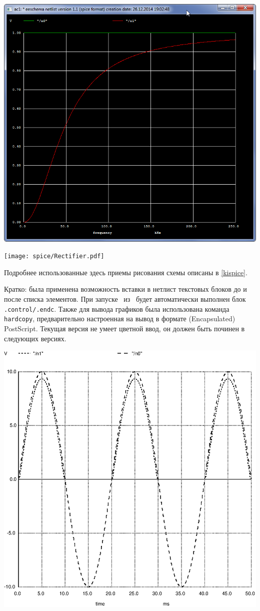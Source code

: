 \pagebreak\noindent
\includegraphics[height=\textheight]{spice/spice5.png}


\noindent
\texttt{[image: spice/Rectifier.pdf]}


Подробнее использованные здесь приемы рисования схемы описаны в \ref{kispice}.

Кратко: была применена возможность вставки в нетлист текстовых блоков до и после
списка элементов. При запуске \ из \ будет
автоматически выполнен блок \verb|.control/.endc|. Также для вывода графиков
была использована команда \verb|hardcopy|, предварительно настроенная на вывод в
формате (Encapsulated) PostScript. Текущая версия  не умеет
цветной ввод, он должен быть починен в следующих версиях.

\pagebreak\noindent
\includegraphics[height=\textheight]{spice/rectifierplot.eps}

\secup



\secup
